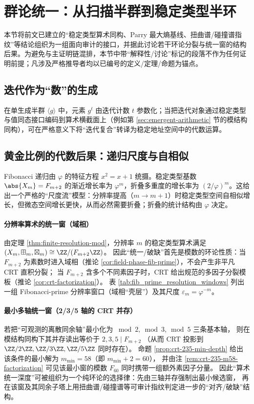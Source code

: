 \section{群论统一：从扫描半群到稳定类型半环}\label{sec:group-unification}

本节将前文已建立的“稳定类型算术同构、Parry 最大熵基线、扭曲谱/碰撞谱指纹”等结论组织为一组面向审计的接口，并据此讨论若干环论分裂与统一窗的结构后果。为避免与主证明链混排，本节中带“解释性/讨论”标记的段落不作为任何证明前提；凡涉及严格推导者均以已编号的定义/定理/命题为锚点。

\subsection{迭代作为“数”的生成}

在单生成半群 \(\langle g\rangle\) 中，元素 \(g^t\) 由迭代计数 \(t\) 参数化；当把迭代对象通过稳定类型与值同态接口编码到算术横截面上（例如第 \ref{sec:emergent-arithmetic} 节的模结构同构），可在严格意义下将“迭代复合”转译为稳定地址空间中的代数运算。

\subsection{黄金比例的代数后果：递归尺度与自相似}

Fibonacci 递归由 $\varphi$ 的特征方程 $x^2=x+1$ 统摄。稳定类型基数 $\abs{X_m}=F_{m+2}$ 的渐近增长率为 $\varphi^m$，折叠多重度的增长率为 $(2/\varphi)^m$。这给出一个严格的“尺度流”模型：分辨率提高（$m\to m+1$）时稳定类型空间自相似增长，但微态空间增长更快，从而必然需要折叠；折叠的统计结构由 $\varphi$ 决定。

\paragraph{分辨率算术的统一窗（域相）}
由定理 \ref{thm:finite-resolution-mod}，分辨率 $m$ 的稳定类型算术满足
\((X_m,\boxplus_m,\boxtimes_m)\cong \ZZ/(F_{m+2}\ZZ)\)。
因此“统一/破缺”首先是模数的环论性质：当 $F_{m+2}$ 为素数时进入域相（推论 \ref{cor:field-phase-fib-prime}），不会产生非平凡 CRT 直积分裂；
当 $F_{m+2}$ 含多个不同素因子时，CRT 给出规范的多因子分裂模板（推论 \ref{cor:crt-factorization}）。
表 \ref{tab:fib_prime_resolution_windows} 列出一组 Fibonacci-prime 分辨率窗口（域相“壳层”）及其尺度 $\varepsilon_m=\varphi^{-m}$。




\paragraph{最小多轴统一窗（2/3/5 轴的 CRT 并存）}
若把“可观测的离散同余轴”最小化为 \(\bmod 2,\bmod 3,\bmod 5\) 三条基本轴，
则在模结构同构下其并存读出等价于
\(
2,3,5\mid F_{m+2}
\)
（从而 CRT 投影到 \(\ZZ/2\ZZ,\ZZ/3\ZZ,\ZZ/5\ZZ\) 同时存在）。
命题 \ref{prop:crt-235-min-depth} 给出该条件的最小解为 \(m_{\min}=58\)（即 \(m_{\min}+2=60\)），
并由注 \ref{rem:crt-235-m58-factorization} 可见该最小窗的模数 \(F_{60}\) 同时携带一组额外素因子分量。
因此“算术统一深度”可被组织为一个纯环论的选择律：先由三轴并存强制出最小候选窗，
再在该窗及其同余子塔上用扭曲谱/碰撞谱等可审计指纹判定进一步的“对齐/破缺”结构。

